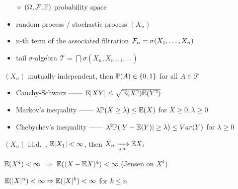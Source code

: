 \begin{itemize}
    \item[$\diamond$] $(\Omega, \mathcal{F}, \mathbb{P})$ probability space
    \item random process / stochastic process $(X_n)$
    \item n-th term of the associated filtration $\mathcal{F}_n = \sigma(X_1, \dots, X_n)$
    \item tail $\sigma$-algebra $\mathcal{T} = \bigcap \sigma(X_n, X_{n+1}, \dots)$
\end{itemize}

\begin{thm}
    $(X_n)$ mutually independent, then $\mathbb{P}(A) \in \left\{ 0, 1 \right\}$ for all $A \in \mathcal{T}$
\end{thm}

\begin{itemize}
    \item Cauchy-Schwarz ------ $\mathbb{E}|XY| \leq \sqrt{\mathbb{E}(X^2)\mathbb{E}(Y^2)}$
    \item Markov's inequality ------ $\lambda \mathbb{P}(X \geq \lambda) \leq \mathbb{E}(X)$ for $X \geq 0, \lambda \geq 0$
    \item Chebychev's inequality ------ $\lambda^2 \mathbb{P} (|Y - \mathbb{E}(Y)| \geq \lambda) \leq Var(Y)$ for $\lambda \geq 0$
\end{itemize}

\begin{thm}
    $(X_n)$ i.i.d.\ , $\mathbb{E} |X_1| < \infty$, then $\bar{X}_n \xrightarrow[\text{a.s.}]{} \mathbb{E}{X_1}$
\end{thm}

\begin{fact}
    $\mathbb{E}(X^4) < \infty$ $\Rightarrow$ $\mathbb{E}((X - \mathbb{E} X)^4) < \infty$ (Jensen on $X^4$)
\end{fact}

\begin{fact}
    $\mathbb{E}(|X|^n) < \infty \Rightarrow \mathbb{E}(|X|^k) < \infty$ for $k \leq n$
\end{fact}